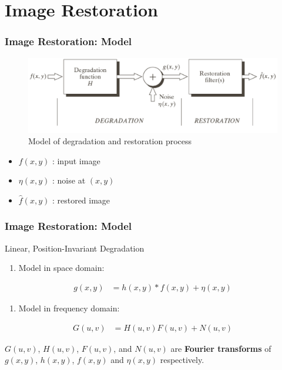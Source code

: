 \documentclass[english,11pt,table,handout]{beamer}
\begin{document}
\section{Image Restoration}
\frame
{
	\frametitle{Image Restoration: Model }
	\begin{figure}[!h]
		\includegraphics[scale=0.5]{degrad_restore.png}
		\caption{Model of degradation and restoration process}
	\end{figure}
	
	\begin{itemize}
		\item $f(x,y)$ : input image
		\item $\eta(x,y)$ : noise at $(x,y)$
		\item $\hat{f}(x,y)$ : restored image
	\end{itemize}
	
}
\frame
{
	\frametitle{Image Restoration: Model }
	\begin{block}{Linear, Position-Invariant Degradation}
		\begin{enumerate}
			\item Model in space domain:
		\end{enumerate}
		\begin{align}
			\nonumber
			g(x,y) &= h(x,y) * f(x,y) + \eta(x,y)
		\end{align}
		\begin{enumerate}
			\item Model in frequency domain:
		\end{enumerate}
		\begin{align}
		\nonumber
		G(u,v) &= H(u,v)F(u,v) + N(u,v)
		\end{align}
	\end{block}
	
	\begin{alertblock}{}
		$G(u,v)$, $H(u,v)$, $F(u,v)$, and $N(u,v)$ are \textbf{Fourier transforms} of $g(x,y)$, $h(x,y)$, $f(x,y)$ and  $\eta(x,y)$ respectively. 
	\end{alertblock}
}
\end{document}
